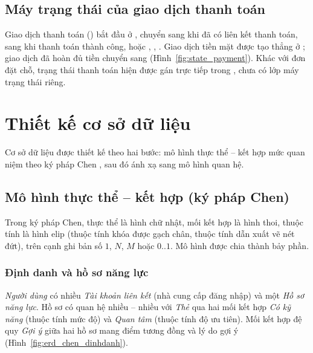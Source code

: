 \subsection{Máy trạng thái của giao dịch thanh toán}
Giao dịch thanh toán () bắt đầu ở , chuyển sang  khi đã có liên kết thanh toán, sang  khi thanh toán thành công, hoặc , , . Giao dịch tiền mặt được tạo thẳng ở ; giao dịch đã hoàn đủ tiền chuyển sang  (Hình~\ref{fig:state_payment}). Khác với đơn đặt chỗ, trạng thái thanh toán hiện được gán trực tiếp trong , chưa có lớp máy trạng thái riêng.


\section{Thiết kế cơ sở dữ liệu}
\label{sec:thietke_csdl}

Cơ sở dữ liệu được thiết kế theo hai bước: mô hình thực thể -- kết hợp mức quan niệm theo ký pháp Chen \cite{chen1976er}, sau đó ánh xạ sang mô hình quan hệ.

\subsection{Mô hình thực thể -- kết hợp (ký pháp Chen)}
\label{ssec:erd_quan_niem}

Trong ký pháp Chen, thực thể là hình chữ nhật, mối kết hợp là hình thoi, thuộc tính là hình elip (thuộc tính khóa được gạch chân, thuộc tính dẫn xuất vẽ nét đứt), trên cạnh ghi bản số $1$, $N$, $M$ hoặc $0..1$. Mô hình được chia thành bảy phần.

\subsubsection{Định danh và hồ sơ năng lực}
\emph{Người dùng} có nhiều \emph{Tài khoản liên kết} (nhà cung cấp đăng nhập) và một \emph{Hồ sơ năng lực}. Hồ sơ có quan hệ nhiều -- nhiều với \emph{Thẻ} qua hai mối kết hợp \emph{Có kỹ năng} (thuộc tính mức độ) và \emph{Quan tâm} (thuộc tính độ ưu tiên). Mối kết hợp đệ quy \emph{Gợi ý} giữa hai hồ sơ mang điểm tương đồng và lý do gợi ý (Hình~\ref{fig:erd_chen_dinhdanh}).


